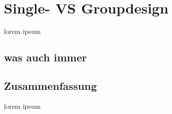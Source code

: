 \chapter{Single- VS Groupdesign}\label{ch:SingleVSGroupDesign}

lorem ipsum

\section{was auch immer}



\section*{Zusammenfassung}
lorem ipsum